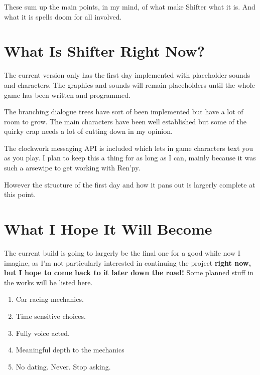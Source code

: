 \documentclass[11pt, a4paper]{article}
\begin{document}
These sum up the main points, in my mind, of what make Shifter what it is. And what it is spells doom for all involved.

\section{What Is Shifter Right Now?}
The current version only has the first day implemented with placeholder sounds and characters. The graphics and sounds will remain placeholders until the whole game has been written and programmed.

The branching dialogue trees have sort of been implemented but have a lot of room to grow. The main characters have been well established but some of the quirky crap needs a lot of cutting down in my opinion. 

The clockwork messaging API is included which lets in game characters text you as you play. I plan to keep this a thing for as long as I can, mainly because it was such a arsewipe to get working with Ren'py. 

However the structure of the first day and how it pans out is largerly complete at this point. 

\section{What I Hope It Will Become}
The current build is going to largerly be the final one for a good while now I imagine, as I'm not particularly interested in continuing the project \textbf{right now, but I hope to come back to it later down the road!}
Some planned stuff in the works will be listed here.
\begin{enumerate}
\item{Car racing mechanics.}
\item{Time sensitive choices.}
\item{Fully voice acted.}
\item{Meaningful depth to the mechanics}
\item{No dating. Never. Stop asking.}
\end{enumerate}
\end{document}
